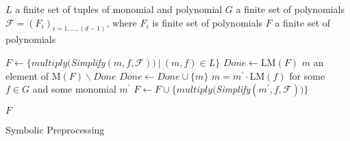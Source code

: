 \begin{algorithm}[ht]
  \begin{algorithmic}[1]
    \Require
      \Statex $L$ a finite set of tuples of monomial and polynomial
      \Statex $G$ a finite set of polynomials
      \Statex $\mathcal{F} = (F_i)_{i=1,\ldots,(d-1)}$, where $F_i$ is finite set of polynomials
    \Ensure
      \Statex $F$ a finite set of polynomials
      \Statex

    \State $F \gets \big\{multiply($\textit{Simplify}$(m, f, \mathcal{F}))\ |\ (m, f)\in L\big\}$
    \State $Done \gets \textrm{LM}(F)$
      \State $m$ an element of $\textrm{M}(F)\backslash Done$
      \State $Done \gets Done \cup \{m\}$
        \State $m = m^\prime \cdot\textrm{LM}(f)$ for some $f \in G$ and some monomial $m^\prime$
        \State $F \gets F \cup \big\{multiply($\textit{Simplify}$(m^\prime, f, \mathcal{F}))\big\}$
      \EndIf
    \EndWhile

    \State \Return $F$

  \end{algorithmic}
  \caption{Symbolic Preprocessing}
  \label{alg:symbolicPreprocessing}
\end{algorithm}

